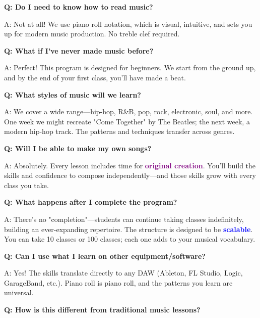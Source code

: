 \documentclass[11pt,letterpaper]{article}
\newcommand{\purple}[1]{\textcolor{purple}{\textbf{#1}}}
\newcommand{\bluepurple}[1]{\textcolor{blue}{\textbf{#1}}}
\begin{document}
\textbf{Q: Do I need to know how to read music?}

A: Not at all! We use piano roll notation, which is visual, intuitive, and sets you up for modern music production. No treble clef required.

\vspace{0.4cm}

\textbf{Q: What if I've never made music before?}

A: Perfect! This program is designed for beginners. We start from the ground up, and by the end of your first class, you'll have made a beat.

\vspace{0.4cm}

\textbf{Q: What styles of music will we learn?}

A: We cover a wide range—hip-hop, R\&B, pop, rock, electronic, soul, and more. One week we might recreate "Come Together" by The Beatles; the next week, a modern hip-hop track. The patterns and techniques transfer across genres.

\vspace{0.4cm}

\textbf{Q: Will I be able to make my own songs?}

A: Absolutely. Every lesson includes time for \purple{original creation}. You'll build the skills and confidence to compose independently—and those skills grow with every class you take.

\vspace{0.4cm}

\textbf{Q: What happens after I complete the program?}

A: There's no "completion"—students can continue taking classes indefinitely, building an ever-expanding repertoire. The structure is designed to be \bluepurple{scalable}. You can take 10 classes or 100 classes; each one adds to your musical vocabulary.

\vspace{0.4cm}

\textbf{Q: Can I use what I learn on other equipment/software?}

A: Yes! The skills translate directly to any DAW (Ableton, FL Studio, Logic, GarageBand, etc.). Piano roll is piano roll, and the patterns you learn are universal.

\vspace{0.4cm}

\textbf{Q: How is this different from traditional music lessons?}
\end{document}
